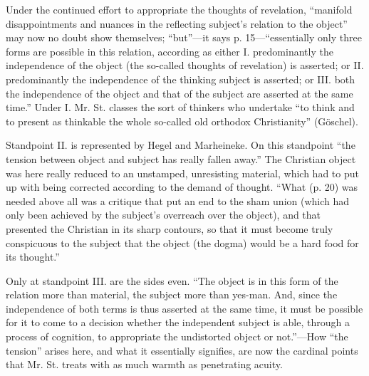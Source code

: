 \documentclass[12pt,a4paper,openany]{book}
\newcommand{\opage}[1]{\marginnote{\footnotesize\textit{[#1]}}}
\begin{document}
Under the continued effort to appropriate the thoughts of
revelation, ``manifold disappointments
and nuances in the reflecting subject's relation
to the object'' may now no doubt show themselves; ``but''---it says
p. 15---``essentially only three forms are possible in this relation,
according as either I. predominantly the independence of the object (the so-called thoughts of revelation)
is asserted; or II. predominantly
the independence of the thinking subject is asserted; or III. both
the independence of the object and that of the subject are asserted at the same time.''
Under I. Mr. St. classes the sort of thinkers who undertake
``to think and to present as thinkable the whole
so-called old orthodox Christianity'' (Göschel).

Standpoint II. is represented by Hegel and Marheineke.
On this standpoint ``the tension between object
and subject has really fallen away.'' The Christian object
was here really reduced to an unstamped, unresisting material,
which had to put up with being corrected according to the demand of thought.
\setcounter{footnote}{0}%
\opage{18}``What (p. 20) was needed above all was a
critique that put an end to the sham union (which had only been
achieved by the subject's overreach over the object), and that
presented the Christian in its sharp contours, so that
it must become truly conspicuous to the subject that the object
(the dogma) would be a hard food for its thought.''

Only at standpoint III. are the sides even. ``The object
is in this form of the relation more than material, the subject
more than yes-man. And, since the independence of both terms
is thus asserted at the same time, it must be possible for it to come to
a decision whether the independent subject is able, through a process of cognition,
to appropriate the undistorted object or
not.''---How ``the tension'' arises here, and what
it essentially signifies, are now the cardinal points that Mr.
St. treats with as much warmth as penetrating
acuity.
\end{document}
